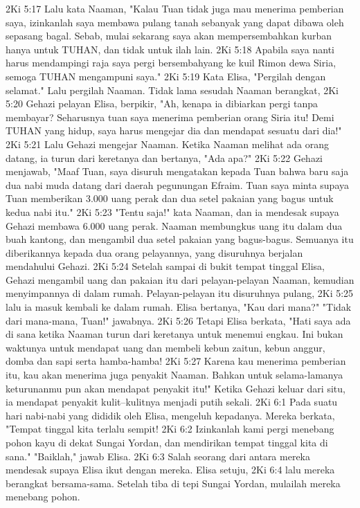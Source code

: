 2Ki 5:17  Lalu kata Naaman, "Kalau Tuan tidak juga mau menerima pemberian saya, izinkanlah saya membawa pulang tanah sebanyak yang dapat dibawa oleh sepasang bagal. Sebab, mulai sekarang saya akan mempersembahkan kurban hanya untuk TUHAN, dan tidak untuk ilah lain.
2Ki 5:18  Apabila saya nanti harus mendampingi raja saya pergi bersembahyang ke kuil Rimon dewa Siria, semoga TUHAN mengampuni saya."
2Ki 5:19  Kata Elisa, "Pergilah dengan selamat." Lalu pergilah Naaman. Tidak lama sesudah Naaman berangkat,
2Ki 5:20  Gehazi pelayan Elisa, berpikir, "Ah, kenapa ia dibiarkan pergi tanpa membayar? Seharusnya tuan saya menerima pemberian orang Siria itu! Demi TUHAN yang hidup, saya harus mengejar dia dan mendapat sesuatu dari dia!"
2Ki 5:21  Lalu Gehazi mengejar Naaman. Ketika Naaman melihat ada orang datang, ia turun dari keretanya dan bertanya, "Ada apa?"
2Ki 5:22  Gehazi menjawab, "Maaf Tuan, saya disuruh mengatakan kepada Tuan bahwa baru saja dua nabi muda datang dari daerah pegunungan Efraim. Tuan saya minta supaya Tuan memberikan 3.000 uang perak dan dua setel pakaian yang bagus untuk kedua nabi itu."
2Ki 5:23  "Tentu saja!" kata Naaman, dan ia mendesak supaya Gehazi membawa 6.000 uang perak. Naaman membungkus uang itu dalam dua buah kantong, dan mengambil dua setel pakaian yang bagus-bagus. Semuanya itu diberikannya kepada dua orang pelayannya, yang disuruhnya berjalan mendahului Gehazi.
2Ki 5:24  Setelah sampai di bukit tempat tinggal Elisa, Gehazi mengambil uang dan pakaian itu dari pelayan-pelayan Naaman, kemudian menyimpannya di dalam rumah. Pelayan-pelayan itu disuruhnya pulang,
2Ki 5:25  lalu ia masuk kembali ke dalam rumah. Elisa bertanya, "Kau dari mana?" "Tidak dari mana-mana, Tuan!" jawabnya.
2Ki 5:26  Tetapi Elisa berkata, "Hati saya ada di sana ketika Naaman turun dari keretanya untuk menemui engkau. Ini bukan waktunya untuk mendapat uang dan membeli kebun zaitun, kebun anggur, domba dan sapi serta hamba-hamba!
2Ki 5:27  Karena kau menerima pemberian itu, kau akan menerima juga penyakit Naaman. Bahkan untuk selama-lamanya keturunanmu pun akan mendapat penyakit itu!" Ketika Gehazi keluar dari situ, ia mendapat penyakit kulit--kulitnya menjadi putih sekali.
2Ki 6:1  Pada suatu hari nabi-nabi yang dididik oleh Elisa, mengeluh kepadanya. Mereka berkata, "Tempat tinggal kita terlalu sempit!
2Ki 6:2  Izinkanlah kami pergi menebang pohon kayu di dekat Sungai Yordan, dan mendirikan tempat tinggal kita di sana." "Baiklah," jawab Elisa.
2Ki 6:3  Salah seorang dari antara mereka mendesak supaya Elisa ikut dengan mereka. Elisa setuju,
2Ki 6:4  lalu mereka berangkat bersama-sama. Setelah tiba di tepi Sungai Yordan, mulailah mereka menebang pohon.
